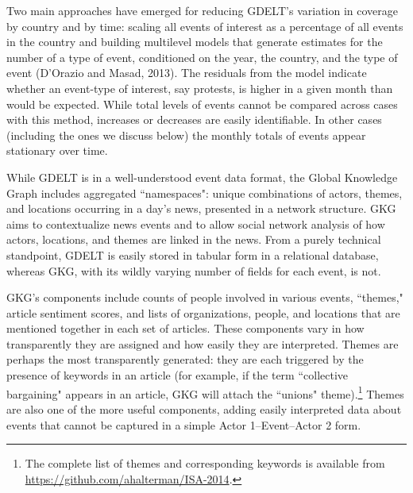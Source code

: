 \documentclass[10pt]{article}
\begin{document}
Two main approaches have emerged for reducing GDELT's variation in coverage by country and by time: scaling all events of interest as a percentage of all events in the country \citep{brandt2013} and building multilevel models that generate estimates for the number of a type of event, conditioned on the year, the country, and the type of event (D'Orazio and Masad, 2013). The residuals from the model indicate whether an event-type of interest, say protests, is higher in a given month than would be expected. While total levels of events cannot be compared across cases with this method, increases or decreases are easily identifiable. In other cases (including the ones we discuss below) the monthly totals of events appear stationary over time.


While GDELT is in a well-understood event data format, the Global Knowledge Graph includes aggregated ``namespaces": unique combinations of actors, themes, and locations occurring in a day's news, presented in a network structure.  GKG aims to contextualize news events and to allow social network analysis of how actors, locations, and themes are linked in the news.  From a purely technical standpoint, GDELT is easily stored in tabular form in a relational database, whereas GKG, with its wildly varying number of fields for each event, is not.  

GKG's components include counts of people involved in various events, ``themes," article sentiment scores, and lists of organizations, people, and locations that are mentioned together in each set of articles. These components vary in how transparently they are assigned and how easily they are interpreted. Themes are perhaps the most transparently generated: they are each triggered by the presence of keywords in an article (for example, if the term ``collective bargaining" appears in an article, GKG will attach the ``unions" theme).\footnote{The complete list of themes and corresponding keywords is available from \url{https://github.com/ahalterman/ISA-2014}.} Themes are also one of the more useful components, adding easily interpreted data about events that cannot be captured in a simple Actor 1--Event--Actor 2 form.
\end{document}
